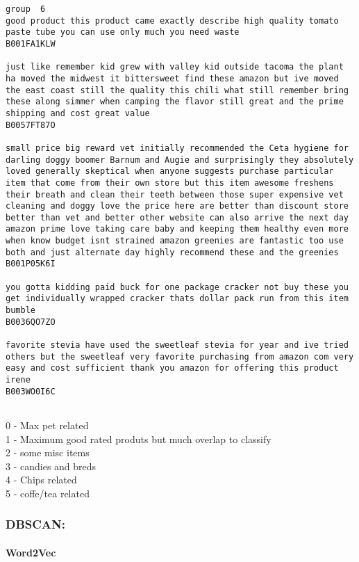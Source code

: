 \documentclass[11pt]{article}
\begin{document}
\begin{Verbatim}[commandchars=\\\{\}]
group  6
good product this product came exactly describe high quality tomato paste tube you can use only much you need waste
B001FA1KLW

just like remember kid grew with valley kid outside tacoma the plant ha moved the midwest it bittersweet find these amazon but ive moved the east coast still the quality this chili what still remember bring these along simmer when camping the flavor still great and the prime shipping and cost great value
B0057FT87O

small price big reward vet initially recommended the Ceta hygiene for darling doggy boomer Barnum and Augie and surprisingly they absolutely loved generally skeptical when anyone suggests purchase particular item that come from their own store but this item awesome freshens their breath and clean their teeth between those super expensive vet cleaning and doggy love the price here are better than discount store better than vet and better other website can also arrive the next day amazon prime love taking care baby and keeping them healthy even more when know budget isnt strained amazon greenies are fantastic too use both and just alternate day highly recommend these and the greenies
B001P05K6I

you gotta kidding paid buck for one package cracker not buy these you get individually wrapped cracker thats dollar pack run from this item bumble
B0036QO7ZO

favorite stevia have used the sweetleaf stevia for year and ive tried others but the sweetleaf very favorite purchasing from amazon com very easy and cost sufficient thank you amazon for offering this product irene
B003WO0I6C


    \end{Verbatim}

    0 - Max pet related\\
1 - Maximum good rated produts but much overlap to classify\\
2 - some misc items\\
3 - candies and breds\\
4 - Chips related\\
5 - coffe/tea related

    \subsubsection{DBSCAN:}\label{dbscan}

    \paragraph{Word2Vec}\label{word2vec}
\end{document}
